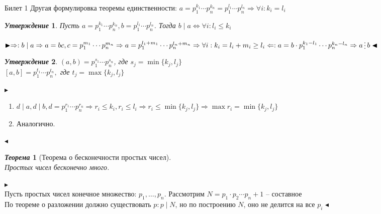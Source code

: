 \documentclass[a4paper,12pt]{article}
\newcommand{\divisible}{\mathop{\raisebox{-2pt}{\vdots}}}
\newtheorem{teo}{\textit{Теорема}}
\newtheorem{utv}{\textit{Утверждение}}
\newcommand{\q}{\quad}
\newcommand{\pb}{\blacktriangleright}
\newcommand{\pe}{\blacktriangleleft}
\newcommand{\Ra}{\Rightarrow}
\begin{document}
\newpage
\begin{mybox}{{Билет 1}}
Другая формулировка теоремы единственности: $a = p_1^{k_1}\cdots p_n^{k_n} = p_1^{l_1}\cdots p_n^{l_n}\Ra \forall i: k_i = l_i$\\
\begin{formbox}{}
\begin{utv} Пусть $a = p_1^{k_1}\cdots p_n^{k_n}, b = p_1^{l_1}\cdots p_n^{l_n}$. Тогда $b\mid a\iff \forall i: l_i \le k_i$
\end{utv}
\end{formbox}

$\pb  \Ra: b\mid a\Ra a = bc, c = p_1^{m_1}\cdots p_n^{m_n}\Ra a = p_1^{l_1 + m_1}\cdots p_n^{l_n + m_n}\Ra \forall i: k_i = l_i + m_i \ge l_i\\\q\\ \Leftarrow: a = b\cdot p_1^{k_1-l_1}\cdots p_n^{k_n - l_n}\Ra a\divisible b \pe$


\begin{formbox}{}
\begin{utv} $(a,b) = p_1^{s_1}\cdots p_n^{s_n}$, где $s_j = \min\{k_j, l_j\}$\\
$[a,b] = p_1^{t_1}\cdots p_n^{t_n},$ где $t_j = \max\{k_j, l_j\}$
\end{utv}
\end{formbox}

$\pb  $
\begin{enumerate}
\item $d\mid a, d\mid b, d = p_1^{r_1}\cdots p_n^{r_n}\Ra r_i\le k_i, r_i \le l_i\Ra r_i \le \min\{k_j, l_j\} \Ra \max r_i = \min\{k_j, l_j\}$
\item Аналогично.
\end{enumerate}
$\pe$


\begin{formbox}{}
\begin{teo}[Теорема о бесконечности простых чисел]\q\\
Простых чисел бесконечно много.
\end{teo}
\end{formbox}

$\pb     $\\
Пусть простых чисел конечное множество: $p_1,\dots,p_n$. Рассмотрим $N = p_1\cdot p_2\cdots p_n + 1$ -- составное\\
По теореме о разложении должно существовать $p: p\mid N$, но по построению $N$, оно не делится на все $p_i$
$\pe$
\end{mybox}
\end{document}
